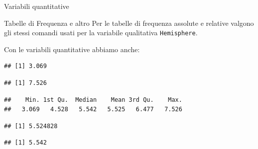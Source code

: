 \documentclass[
  ignorenonframetext,
]{beamer}
\newenvironment{Shaded}{\begin{snugshade}}{\end{snugshade}}
\newcommand{\KeywordTok}[1]{\textcolor[rgb]{0.13,0.29,0.53}{\textbf{#1}}}
\newcommand{\NormalTok}[1]{#1}
\newcommand{\OperatorTok}[1]{\textcolor[rgb]{0.81,0.36,0.00}{\textbf{#1}}}
\begin{document}
\begin{frame}[fragile]{Variabili quantitative}
\protect\hypertarget{variabili-quantitative}{}
\begin{block}{Tabelle di Frequenza e altro}
\protect\hypertarget{tabelle-di-frequenza-e-altro}{}
Per le tabelle di frequenza assolute e relative valgono gli stessi
comandi usati per la variabile qualitativa \texttt{Hemisphere}.

Con le variabili quantitative abbiamo anche:

\begin{Shaded}
\end{Shaded}

\begin{verbatim}
## [1] 3.069
\end{verbatim}

\begin{Shaded}
\end{Shaded}

\begin{verbatim}
## [1] 7.526
\end{verbatim}

\begin{Shaded}
\end{Shaded}

\begin{verbatim}
##    Min. 1st Qu.  Median    Mean 3rd Qu.    Max. 
##   3.069   4.528   5.542   5.525   6.477   7.526
\end{verbatim}

\begin{Shaded}
\end{Shaded}

\begin{verbatim}
## [1] 5.524828
\end{verbatim}

\begin{Shaded}
\end{Shaded}

\begin{verbatim}
## [1] 5.542
\end{verbatim}
\end{block}
\end{frame}
\end{document}
